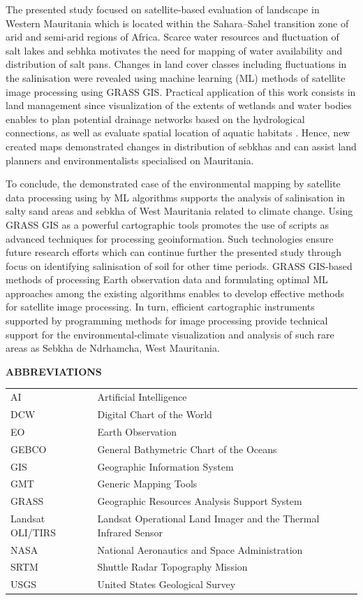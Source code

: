 \documentclass[12pt,a4paper,oneside]{article}
\def \newsection{\vspace{12pt}\textbf}
\def \newpar{\vspace{6pt}}
\begin{document}
\newpar The presented study focused on satellite-based evaluation of landscape in Western Mauritania which is located within the Sahara–Sahel transition zone of arid and semi-arid regions of Africa. Scarce water resources and fluctuation of salt lakes and sebhka motivates the need for mapping of water availability and distribution of salt pans. Changes in land cover classes including fluctuations in the salinisation were revealed using machine learning (ML) methods of satellite image processing using GRASS GIS. Practical application of this work consists in land management since visualization of the extents of wetlands and water bodies enables to plan potential drainage networks based on the hydrological connections, as well as evaluate spatial location of aquatic habitats \cite{CAMPOS2012438}. Hence, new created maps demonstrated changes in distribution of sebkhas and can assist land planners and environmentalists specialised on Mauritania.

\newpar To conclude, the demonstrated case of the environmental mapping by satellite data processing using by ML algorithms supports the analysis of salinisation in salty sand areas and sebkha of West Mauritania related to climate change. Using GRASS GIS as a powerful cartographic tools promotes the use of scripts as advanced techniques for processing geoinformation. Such  technologies ensure future research efforts which can continue further the presented study through focus on identifying salinisation of soil for other time periods. GRASS GIS-based methods of processing Earth observation data and formulating optimal ML approaches among the existing algorithms enables to develop effective methods for satellite image processing. In turn, efficient cartographic instruments supported by programming methods for image processing provide technical support for the environmental-climate visualization and analysis of such rare areas as Sebkha de Ndrhamcha, West Mauritania. 

\vspace{12pt}

\newsection {ABBREVIATIONS}
\vspace{12pt}

\begin{tabular}{@{}ll}
AI & Artificial Intelligence \\
DCW & Digital Chart of the World \\
EO & Earth Observation\\
GEBCO & General Bathymetric Chart of the Oceans \\
GIS & Geographic Information System \\
GMT & Generic Mapping Tools \\
GRASS & Geographic Resources Analysis Support System \\
Landsat OLI/TIRS & Landsat Operational Land Imager and the Thermal Infrared Sensor \\
NASA & National Aeronautics and Space Administration \\
SRTM & Shuttle Radar Topography Mission \\
USGS & United States Geological Survey
\end{tabular}
\end{document}
